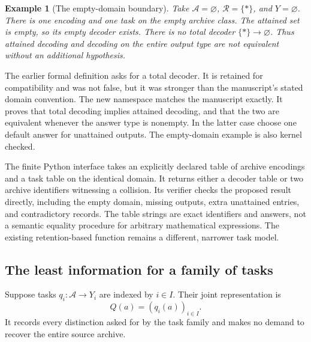\documentclass[11pt,oneside]{article}
\theoremstyle{komorebiplain}
\theoremstyle{komorebidefinition}
\newtheorem{example}[theorem]{Example}
\theoremstyle{komorebiremark}
\begin{document}
\begin{example}[The empty-domain boundary]
\label{res:new:empty-decoder}
Take $\mathscr A=\varnothing$, $\mathcal R=\{*\}$, and $Y=\varnothing$. There is one encoding and one task on the empty archive class. The attained set is empty, so its empty decoder exists. There is no total decoder $\{*\}\to\varnothing$. Thus attained decoding and decoding on the entire output type are not equivalent without an additional hypothesis.
\end{example}

The earlier formal definition  asks for a total decoder. It is retained for compatibility and was not false, but it was stronger than the manuscript's stated domain convention. The new namespace  matches the manuscript exactly. It proves that total decoding implies attained decoding, and that the two are equivalent whenever the answer type is nonempty. In the latter case choose one default answer for unattained outputs. The empty-domain example is also kernel checked.

The finite Python interface  takes an explicitly declared table of archive encodings and a task table on the identical domain. It returns either a decoder table or two archive identifiers witnessing a collision. Its verifier checks the proposed result directly, including the empty domain, missing outputs, extra unattained entries, and contradictory records. The table strings are exact identifiers and answers, not a semantic equality procedure for arbitrary mathematical expressions. The existing retention-based  function remains a different, narrower task model.

\subsection{The least information for a family of tasks}
\label{sec:joint-recovery}

Suppose tasks $q_i:\mathscr A\to Y_i$ are indexed by $i\in I$. Their joint representation is
\[
 Q(a)=(q_i(a))_{i\in I}.
\]
It records every distinction asked for by the task family and makes no demand to recover the entire source archive.
\end{document}

